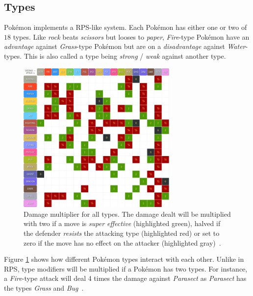 \subsection{Types}
\label{sec:types}
Pokémon implements a \ac{RPS}-like system. Each Pokémon has either one or two of 
$18$ types. Like \emph{rock} beats \emph{scissors} but looses to \emph{paper}, \textit{Fire}-type Pokémon have an
\textit{advantage} against \textit{Grass}-type Pokémon but are on a \textit{disadvantage} against \textit{Water}-types.
This is also called a type being \textit{strong} / \textit{weak} against another type.
\begin{figure}
	\centering
	\includegraphics[width=0.7\textwidth]{images/type_chart.png}
	\caption{Damage multiplier for all types. The damage dealt will be multiplied with two if a move
	is \textit{super effective} (highlighted green), halved if the defender \textit{resists} the attacking
	type (highlighted red) or set to zero if the move has no effect on the attacker (highlighted 
	gray)~\autocite{Pokemondb:Type}.}
	\label{fig:type_chart}
\end{figure}
Figure \ref{fig:type_chart} shows how different Pokémon types interact with each other.
Unlike in \ac{RPS}, type modifiers will be multiplied if a Pokémon has two types. For instance, a \textit{Fire}-type
attack will deal 4 times the damage against \textit{Parasect} as \textit{Parasect} has the types \textit{Grass} and
\textit{Bug}~\autocite{Veekun:Parasect}.

